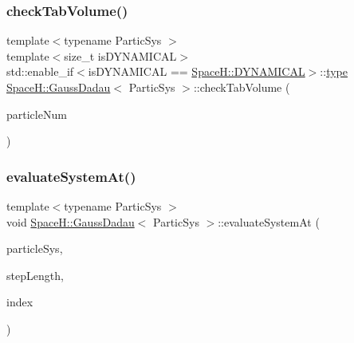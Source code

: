 \mbox{\label{class_space_h_1_1_gauss_dadau_acd04be9569a1426f923714b6086598a5}} 
\subsubsection{\texorpdfstring{check\+Tab\+Volume()}{checkTabVolume()}\hspace{0.1cm}{\footnotesize\ttfamily [2/2]}}
{\footnotesize\ttfamily template$<$typename Partic\+Sys $>$ \\
template$<$size\+\_\+t is\+D\+Y\+N\+A\+M\+I\+C\+AL$>$ \\
std\+::enable\+\_\+if$<$is\+D\+Y\+N\+A\+M\+I\+C\+AL == \mbox{\hyperlink{namespace_space_h_a3e55b9bc2a9e10c08ce8121bce11244a}{Space\+H\+::\+D\+Y\+N\+A\+M\+I\+C\+AL}}$>$\+::\mbox{\hyperlink{class_space_h_1_1_gauss_dadau_a780629d19a82feeab959cd68c8a5f8a3}{type}} \mbox{\hyperlink{class_space_h_1_1_gauss_dadau}{Space\+H\+::\+Gauss\+Dadau}}$<$ Partic\+Sys $>$\+::check\+Tab\+Volume (\begin{DoxyParamCaption}\item[{size\+\_\+t}]{particle\+Num }\end{DoxyParamCaption})\hspace{0.3cm}{\ttfamily [inline]}}

\mbox{\label{class_space_h_1_1_gauss_dadau_a135095dd4f33570045a327dec46e6840}} 
\subsubsection{\texorpdfstring{evaluate\+System\+At()}{evaluateSystemAt()}}
{\footnotesize\ttfamily template$<$typename Partic\+Sys $>$ \\
void \mbox{\hyperlink{class_space_h_1_1_gauss_dadau}{Space\+H\+::\+Gauss\+Dadau}}$<$ Partic\+Sys $>$\+::evaluate\+System\+At (\begin{DoxyParamCaption}\item[{Partic\+Sys \&}]{particle\+Sys,  }\item[{\mbox{\hyperlink{class_space_h_1_1_gauss_dadau_ace42540e9fb47d7f1d1f00622bbd1ccb}{Scalar}}}]{step\+Length,  }\item[{size\+\_\+t}]{index }\end{DoxyParamCaption})\hspace{0.3cm}{\ttfamily [inline]}}

